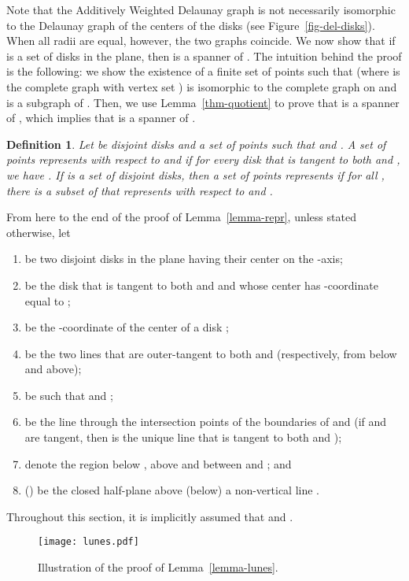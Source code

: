 \documentclass[pdftex,leqno,fleqn,12pt]{article}
\newtheorem{definition}[theorem]{Definition}
\begin{document}
Note that the Additively Weighted Delaunay graph is not necessarily isomorphic
to the Delaunay graph of the centers of the disks (see
Figure~\ref{fig-del-disks}). When all radii are equal, however, the two graphs
coincide. We now show that if  is a set of disks in the plane,
then  is a spanner of . The intuition behind
the proof is the following: we show the existence of a finite set of points 
such that  (where  is the complete graph with vertex
set ) is isomorphic to the complete graph on  and
 is a subgraph of . Then, we use
Lemma~\ref{thm-quotient} to prove that  is a spanner of
, which implies that  is a spanner of
.

\begin{definition}\label{def-repr} Let  be disjoint disks and  a set of points such
that  and . A set of points 
\emph{represents}  with respect to  and  if for every disk  that is tangent to both  and
, we have . If  is a set of
disjoint disks, then a set of points  \emph{represents}  if for all
, there is a subset of  that represents  with respect to 
and .
\end{definition}
From here to the end of the proof of Lemma~\ref{lemma-repr}, unless stated otherwise, let
\begin{enumerate}
\item  be two disjoint disks in the plane having their
center on the -axis;
\item  be the disk that is tangent to both  and  and whose center has
-coordinate equal to ;
\item  be the -coordinate of the center of a disk ;
\item  be the two lines that are outer-tangent to both  and  (respectively, from below and above);
\item  be such that  and ;
\item  be the line through the intersection points of the boundaries of  and 
(if  and  are tangent, then  is the unique line that is tangent to both
 and );
\item  denote the region below , above  and between
 and ; and
\item  () be the closed half-plane above (below) a non-vertical line .
\end{enumerate}
Throughout this section, it is implicitly assumed that  and .
\begin{figure}
\centering\texttt{[image: lunes.pdf]}\caption{Illustration of the proof of
Lemma~\ref{lemma-lunes}.}\label{fig-lemma-lunes}
\end{figure}
\end{document}
